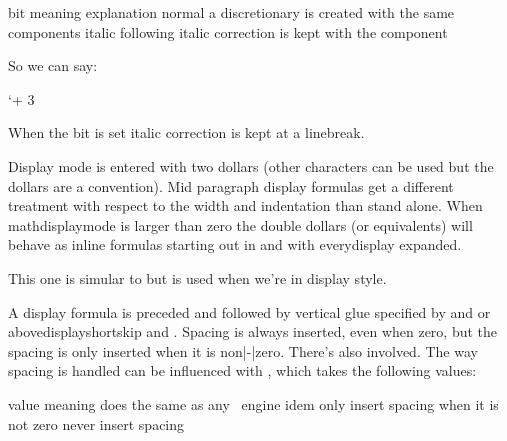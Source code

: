 \starttabulate[|c|l|p|]
\FL
\BC bit \BC meaning \BC explanation \NC \NR
\TL
{}   \NC normal  \NC a discretionary is created with the same components \NC \NR
{}   \NC italic  \NC following italic correction is kept with the component \NC \NR
\LL
\stoptabulate

So we can say:

\starttyping
\hmcode `+ 3
\stoptyping

When the  bit is set italic correction is kept at a linebreak.

\stopnewprimitive

\startnewprimitive[title={\prm {mathdisplaymode}}]

Display mode is entered with two dollars (other characters can be used but the
dollars are a convention). Mid paragraph display formulas get a different
treatment with respect to the width and indentation than stand alone. When \prm
{mathdisplaymode} is larger than zero the double dollars (or equivalents) will
behave as inline formulas starting out in  and with \prm
{everydisplay} expanded.

\stopnewprimitive

\startnewprimitive[title={\prm {mathdisplaypenaltyfactor}}]

This one is simular to  but is used when we're in
display style.

\stopnewprimitive

\startnewprimitive[title={\prm {mathdisplayskipmode}}]

A display formula is preceded and followed by vertical glue specified by
 and  or \prm
{abovedisplayshortskip} and . Spacing 
is always inserted, even when zero, but the spacing  is only
inserted when it is non|-|zero. There's also  involved. The
way spacing is handled can be influenced with , which
takes the following values:


\starttabulate[|c|l|]
\FL
\BC value \BC meaning                                 \NC \NR
\TL
{}     \NC does the same as any \TEX\ engine       \NC \NR
{}     \NC idem                                    \NC \NR
{}     \NC only insert spacing when it is not zero \NC \NR
{}     \NC never insert spacing                    \NC \NR
\LL
\stoptabulate

\stopnewprimitive

